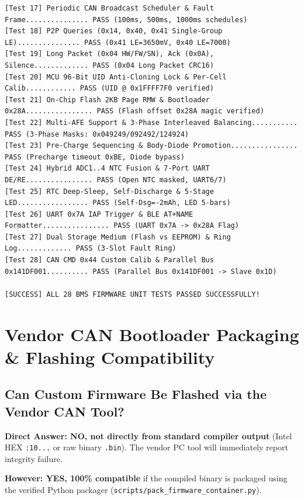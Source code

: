 \documentclass[10pt,a4paper]{article}
\begin{document}
\begin{lstlisting}[basicstyle=\ttfamily\scriptsize,backgroundcolor=\color{LightGray},frame=single,rulecolor=\color{AccentGreen!80!black},title={Host Test Execution Output: 28 of 28 Unit Tests PASSED}]
[Test 17] Periodic CAN Broadcast Scheduler & Fault Frame............... PASS (100ms, 500ms, 1000ms schedules)
[Test 18] P2P Queries (0x14, 0x40, 0x41 Single-Group LE)............... PASS (0x41 LE=3650mV, 0x40 LE=7000)
[Test 19] Long Packet (0x04 HW/FW/SN), Ack (0x0A), Silence............. PASS (0x04 Long Packet CRC16)
[Test 20] MCU 96-Bit UID Anti-Cloning Lock & Per-Cell Calib............ PASS (UID @ 0x1FFFF7F0 verified)
[Test 21] On-Chip Flash 2KB Page RMW & Bootloader 0x28A................ PASS (Flash offset 0x28A magic verified)
[Test 22] Multi-AFE Support & 3-Phase Interleaved Balancing........... PASS (3-Phase Masks: 0x049249/092492/124924)
[Test 23] Pre-Charge Sequencing & Body-Diode Promotion................ PASS (Precharge timeout 0xBE, Diode bypass)
[Test 24] Hybrid ADC1..4 NTC Fusion & 7-Port UART DE/RE................ PASS (Open NTC masked, UART6/7)
[Test 25] RTC Deep-Sleep, Self-Discharge & 5-Stage LED................. PASS (Self-Dsg=-2mAh, LED 5-bars)
[Test 26] UART 0x7A IAP Trigger & BLE AT+NAME Formatter................ PASS (UART 0x7A -> 0x28A Flag)
[Test 27] Dual Storage Medium (Flash vs EEPROM) & Ring Log............. PASS (3-Slot Fault Ring)
[Test 28] CAN CMD 0x44 Custom Calib & Parallel Bus 0x141DF001.......... PASS (Parallel Bus 0x141DF001 -> Slave 0x1D)

[SUCCESS] ALL 28 BMS FIRMWARE UNIT TESTS PASSED SUCCESSFULLY!
\end{lstlisting}

\section{Vendor CAN Bootloader Packaging \& Flashing Compatibility}

\subsection{Can Custom Firmware Be Flashed via the Vendor CAN Tool?}
\textbf{Direct Answer: NO, not directly from standard compiler output} (Intel HEX \texttt{:10...} or raw binary \texttt{.bin}). The vendor PC tool will immediately report integrity failure.

\textbf{However: YES, 100\% compatible} if the compiled binary is packaged using the verified Python packager (\texttt{scripts/pack\_firmware\_container.py}).
\end{document}
